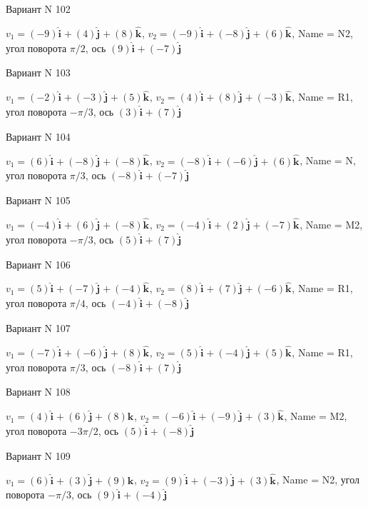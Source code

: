 \documentclass[11pt]{report}
\begin{document}
Вариант N 102

$v_1 = (-9)\mathbf{\hat{i}_{}} + (4)\mathbf{\hat{j}_{}} + (8)\mathbf{\hat{k}_{}}$, $v_2 = (-9)\mathbf{\hat{i}_{}} + (-8)\mathbf{\hat{j}_{}} + (6)\mathbf{\hat{k}_{}}$, Name = N2, угол поворота $\pi / 2$, ось $(9)\mathbf{\hat{i}_{}} + (-7)\mathbf{\hat{j}_{}}$

Вариант N 103

$v_1 = (-2)\mathbf{\hat{i}_{}} + (-3)\mathbf{\hat{j}_{}} + (5)\mathbf{\hat{k}_{}}$, $v_2 = (4)\mathbf{\hat{i}_{}} + (8)\mathbf{\hat{j}_{}} + (-3)\mathbf{\hat{k}_{}}$, Name = R1, угол поворота $- \pi / 3$, ось $(3)\mathbf{\hat{i}_{}} + (7)\mathbf{\hat{j}_{}}$

Вариант N 104

$v_1 = (6)\mathbf{\hat{i}_{}} + (-8)\mathbf{\hat{j}_{}} + (-8)\mathbf{\hat{k}_{}}$, $v_2 = (-8)\mathbf{\hat{i}_{}} + (-6)\mathbf{\hat{j}_{}} + (6)\mathbf{\hat{k}_{}}$, Name = N, угол поворота $\pi / 3$, ось $(-8)\mathbf{\hat{i}_{}} + (-7)\mathbf{\hat{j}_{}}$

Вариант N 105

$v_1 = (-4)\mathbf{\hat{i}_{}} + (6)\mathbf{\hat{j}_{}} + (-8)\mathbf{\hat{k}_{}}$, $v_2 = (-4)\mathbf{\hat{i}_{}} + (2)\mathbf{\hat{j}_{}} + (-7)\mathbf{\hat{k}_{}}$, Name = M2, угол поворота $- \pi / 3$, ось $(5)\mathbf{\hat{i}_{}} + (7)\mathbf{\hat{j}_{}}$

Вариант N 106

$v_1 = (5)\mathbf{\hat{i}_{}} + (-7)\mathbf{\hat{j}_{}} + (-4)\mathbf{\hat{k}_{}}$, $v_2 = (8)\mathbf{\hat{i}_{}} + (7)\mathbf{\hat{j}_{}} + (-6)\mathbf{\hat{k}_{}}$, Name = R1, угол поворота $\pi / 4$, ось $(-4)\mathbf{\hat{i}_{}} + (-8)\mathbf{\hat{j}_{}}$

Вариант N 107

$v_1 = (-7)\mathbf{\hat{i}_{}} + (-6)\mathbf{\hat{j}_{}} + (8)\mathbf{\hat{k}_{}}$, $v_2 = (5)\mathbf{\hat{i}_{}} + (-4)\mathbf{\hat{j}_{}} + (5)\mathbf{\hat{k}_{}}$, Name = R1, угол поворота $\pi / 3$, ось $(-8)\mathbf{\hat{i}_{}} + (7)\mathbf{\hat{j}_{}}$

Вариант N 108

$v_1 = (4)\mathbf{\hat{i}_{}} + (6)\mathbf{\hat{j}_{}} + (8)\mathbf{\hat{k}_{}}$, $v_2 = (-6)\mathbf{\hat{i}_{}} + (-9)\mathbf{\hat{j}_{}} + (3)\mathbf{\hat{k}_{}}$, Name = M2, угол поворота $- 3 \pi / 2$, ось $(5)\mathbf{\hat{i}_{}} + (-8)\mathbf{\hat{j}_{}}$

Вариант N 109

$v_1 = (6)\mathbf{\hat{i}_{}} + (3)\mathbf{\hat{j}_{}} + (9)\mathbf{\hat{k}_{}}$, $v_2 = (9)\mathbf{\hat{i}_{}} + (-3)\mathbf{\hat{j}_{}} + (3)\mathbf{\hat{k}_{}}$, Name = N2, угол поворота $- \pi / 3$, ось $(9)\mathbf{\hat{i}_{}} + (-4)\mathbf{\hat{j}_{}}$
\end{document}
